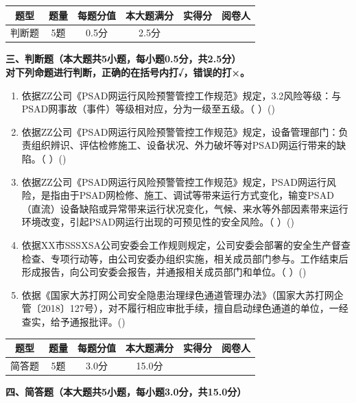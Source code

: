 \documentclass[12pt,a4paper,onecolumn]{ctexart}
\begin{document}
\vspace{10pt}
\begin{flushleft}
\begin{tabular}{|c|c|c|c|c|c|}
\hline
题型 & 题量 & 每题分值 & 本大题满分 & 实得分 & 阅卷人 \\
\hline
判断题 & 5题 & 0.5分 & 2.5分 & & \\
\hline
\end{tabular}
\end{flushleft}
\noindent{}\bfseries{三、判断题（本大题共5小题，每小题0.5分，共2.5分）}\\
\vspace{2pt}
\noindent{}对下列命题进行判断，正确的在括号内打√，错误的打×。
\begin{enumerate}
    \item 依据ZZ公司《PSAD网运行风险预警管控工作规范》规定，3.2风险等级：与PSAD网事故（事件）等级相对应，分为一级至五级。（    ）() \item 依据ZZ公司《PSAD网运行风险预警管控工作规范》规定，设备管理部门：负责组织辨识、评估检修施工、设备状况、外力破坏等对PSAD网运行带来的缺陷。（    ）() \item 依据ZZ公司《PSAD网运行风险预警管控工作规范》规定，PSAD网运行风险，是指由于PSAD网检修、施工、调试等带来运行方式变化，输变PSAD（直流）设备缺陷或异常带来运行状况变化，气候、来水等外部因素带来运行环境改变，引起PSAD网运行出现的可预见性的安全风险。（    ）() \item 依据XX市SSSXSA公司安委会工作规则规定，公司安委会部署的安全生产督查检查、专项行动等，由公司安委办组织实施，相关成员部门参与。工作结束后形成报告，向公司安委会报告，并通报相关成员部门和单位。（    ）() \item 依据《国家大苏打网公司安全隐患治理绿色通道管理办法》（国家大苏打网企管〔2018〕127号），对不履行相应审批手续，擅自启动绿色通道的单位，一经查实，给予通报批评。()
\end{enumerate}
\vspace{10pt}
\begin{flushleft}
\begin{tabular}{|c|c|c|c|c|c|}
\hline
题型 & 题量 & 每题分值 & 本大题满分 & 实得分 & 阅卷人 \\
\hline
简答题 & 5题 & 3.0分 & 15.0分 & & \\
\hline
\end{tabular}
\end{flushleft}
\noindent{}\bfseries{四、简答题（本大题共5小题，每小题3.0分，共15.0分）}\\
\vspace{2pt}
\end{document}
